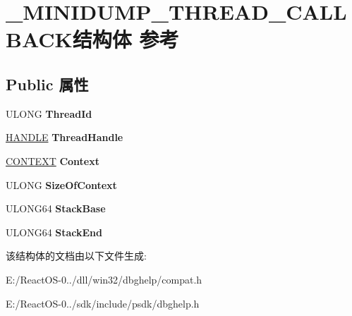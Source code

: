 \hypertarget{struct___m_i_n_i_d_u_m_p___t_h_r_e_a_d___c_a_l_l_b_a_c_k}{}\section{\+\_\+\+M\+I\+N\+I\+D\+U\+M\+P\+\_\+\+T\+H\+R\+E\+A\+D\+\_\+\+C\+A\+L\+L\+B\+A\+C\+K结构体 参考}
\label{struct___m_i_n_i_d_u_m_p___t_h_r_e_a_d___c_a_l_l_b_a_c_k}
\subsection*{Public 属性}
\begin{DoxyCompactItemize}
\item 
\mbox{\label{struct___m_i_n_i_d_u_m_p___t_h_r_e_a_d___c_a_l_l_b_a_c_k_a63143fe507c118c4a4fc7c21060ae066}} 
U\+L\+O\+NG {\bfseries Thread\+Id}
\item 
\mbox{\label{struct___m_i_n_i_d_u_m_p___t_h_r_e_a_d___c_a_l_l_b_a_c_k_a8adf0e38643987b553a9d121794d6c7f}} 
\hyperlink{interfacevoid}{H\+A\+N\+D\+LE} {\bfseries Thread\+Handle}
\item 
\mbox{\label{struct___m_i_n_i_d_u_m_p___t_h_r_e_a_d___c_a_l_l_b_a_c_k_a6adedb6dc58c479000c52ee2d4dd71f9}} 
\hyperlink{struct___c_o_n_t_e_x_t}{C\+O\+N\+T\+E\+XT} {\bfseries Context}
\item 
\mbox{\label{struct___m_i_n_i_d_u_m_p___t_h_r_e_a_d___c_a_l_l_b_a_c_k_a1d2d8168d7d040c4ba4d8e847edb94c8}} 
U\+L\+O\+NG {\bfseries Size\+Of\+Context}
\item 
\mbox{\label{struct___m_i_n_i_d_u_m_p___t_h_r_e_a_d___c_a_l_l_b_a_c_k_a5deda4e41f12be212b8ad09332773499}} 
U\+L\+O\+N\+G64 {\bfseries Stack\+Base}
\item 
\mbox{\label{struct___m_i_n_i_d_u_m_p___t_h_r_e_a_d___c_a_l_l_b_a_c_k_aa3e6847b911d283341d59b67c0f6df39}} 
U\+L\+O\+N\+G64 {\bfseries Stack\+End}
\end{DoxyCompactItemize}


该结构体的文档由以下文件生成\+:\begin{DoxyCompactItemize}
\item 
E\+:/\+React\+O\+S-\/0../dll/win32/dbghelp/compat.\+h\item 
E\+:/\+React\+O\+S-\/0../sdk/include/psdk/dbghelp.\+h\end{DoxyCompactItemize}
